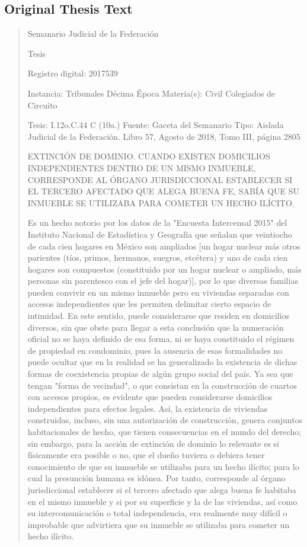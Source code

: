\documentclass[11pt,a4paper]{article}
\begin{document}
\subsection{Original Thesis Text}

\begin{quote}
                                                  Semanario Judicial de la Federación

                                              Tesis

 Registro digital: 2017539

 Instancia: Tribunales            Décima Época                        Materia(s): Civil
 Colegiados de Circuito

 Tesis: I.12o.C.44 C (10a.)       Fuente: Gaceta del Semanario        Tipo: Aislada
                                  Judicial de la Federación.
                                  Libro 57, Agosto de 2018, Tomo III,
                                  página 2805


EXTINCIÓN DE DOMINIO. CUANDO EXISTEN DOMICILIOS INDEPENDIENTES DENTRO DE UN
MISMO INMUEBLE, CORRESPONDE AL ÓRGANO JURISDICCIONAL ESTABLECER SI EL
TERCERO AFECTADO QUE ALEGA BUENA FE, SABÍA QUE SU INMUEBLE SE UTILIZABA
PARA COMETER UN HECHO ILÍCITO.


Es un hecho notorio por los datos de la "Encuesta Intercensal 2015" del Instituto Nacional de
Estadística y Geografía que señalan que veintiocho de cada cien hogares en México son ampliados
[un hogar nuclear más otros parientes (tíos, primos, hermanos, suegros, etcétera) y uno de cada
cien hogares son compuestos (constituido por un hogar nuclear o ampliado, más personas sin
parentesco con el jefe del hogar)], por lo que diversas familias pueden convivir en un mismo
inmueble pero en viviendas separadas con accesos independientes que les permiten delimitar cierto
espacio de intimidad. En este sentido, puede considerarse que residen en domicilios diversos, sin
que obste para llegar a esta conclusión que la numeración oficial no se haya definido de esa forma,
ni se haya constituido el régimen de propiedad en condominio, pues la ausencia de esas
formalidades no puede ocultar que en la realidad se ha generalizado la existencia de dichas formas
de coexistencia propias de algún grupo social del país. Ya sea que tengan "forma de vecindad", o
que consistan en la construcción de cuartos con accesos propios, es evidente que pueden
considerarse domicilios independientes para efectos legales. Así, la existencia de viviendas
construidas, incluso, sin una autorización de construcción, genera conjuntos habitacionales de
hecho, que tienen consecuencias en el mundo del derecho; sin embargo, para la acción de extinción
de dominio lo relevante es si físicamente era posible o no, que el dueño tuviera o debiera tener
conocimiento de que su inmueble se utilizaba para un hecho ilícito; para lo cual la presunción
humana es idónea. Por tanto, corresponde al órgano jurisdiccional establecer si el tercero afectado
que alega buena fe habitaba en el mismo inmueble y si por su superficie y la de las viviendas, así
como su intercomunicación o total independencia, era realmente muy difícil o improbable que
advirtiera que su inmueble se utilizaba para cometer un hecho ilícito.


\end{quote}
\end{document}
